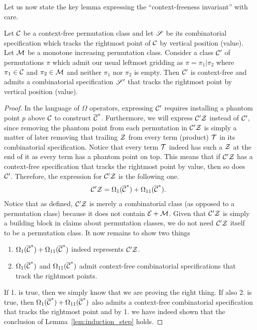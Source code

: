 \documentclass[12pt, a4paper, twoside]{report}
\begin{document}
Let us now state the key lemma expressing the ``context-freeness invariant'' with care.


\begin{lemma}
  \label{lem:induction_step}
  Let $\mathcal{C}$ be a context-free permutation class and let $\mathscr{S}$ be its combinatorial specification which tracks the rightmost point of $\mathcal{C}$ by vertical position (value). Let $\mathcal{M}$ be a monotone increasing permutation class. Consider a class $\mathcal{C}'$ of permutations $\pi$ which admit our usual leftmost gridding as $\pi=\pi_1|\pi_2$ where $\pi_1\in \mathcal{C}$ and $\pi_2\in \mathcal{M}$ and neither $\pi_1$ nor $\pi_2$ is empty. Then $\mathcal{C}'$ is context-free and admits a combinatorial specification $\mathscr{S}'$ that tracks the rightmost point by vertical position (value).
\end{lemma}
\begin{proof}
In the language of $\Omega$ operators, expressing $\mathcal{C}'$ requires installing a phantom point $p$ above $\mathcal{C}$ to construct $\overline{\mathcal{C}}^*$. Furthermore, we will express $\mathcal{C}'\mathcal{Z}$ instead of $\mathcal{C}'$, since removing the phantom point from each permutation in $\mathcal{C}'\mathcal{Z}$ is simply a matter of later removing that trailing $\mathcal{Z}$ from every term (product) $\mathcal{T}$ in its combinatorial specification. Notice that every term $\mathcal{T}$ indeed has such a $\mathcal{Z}$ at the end of it as every term has a phantom point on top. This means that if $\mathcal{C}'\mathcal{Z}$ has a context-free specification that tracks the rightmost point by value, then so does $\mathcal{C}'$. Therefore, the expression for $\mathcal{C}'\mathcal{Z}$ is the following one.
\begin{align}
  \mathcal{C}'\mathcal{Z} = \Omega_1(\overline{\mathcal{C}}^*) + \Omega_{11}(\overline{\mathcal{C}}^*).
  \label{eq:induction_step_expression}
\end{align}
Notice that as defined, $\mathcal{C}'\mathcal{Z}$ is merely a combinatorial class (as opposed to a permutation class) because it does not contain $\mathcal{E} + \mathcal{M}$. Given that $\mathcal{C}'\mathcal{Z}$ is simply a building block in claims about permutation classes, we do not need $\mathcal{C}'\mathcal{Z}$ itself to be a permutation class. It now remains to show two things
\begin{enumerate}
\item $\Omega_1(\overline{\mathcal{C}}^*) + \Omega_{11}(\overline{\mathcal{C}}^*)$ indeed represents $\mathcal{C}'\mathcal{Z}$.
\item $\Omega_1(\overline{\mathcal{C}}^*)$ and $\Omega_{11}(\overline{\mathcal{C}}^*)$ admit context-free combinatorial specifications that track the rightmost points.
\end{enumerate}
If 1. is true, then we simply know that we are proving the right thing. If also 2. is true, then $\Omega_1(\overline{\mathcal{C}}^*) + \Omega_{11}(\overline{\mathcal{C}}^*)$ also admits a context-free combinatorial specification that tracks the rightmost point and by 1. we have indeed shown that the conclusion of Lemma~\ref{lem:induction_step} holds.


\end{proof}
\end{document}
